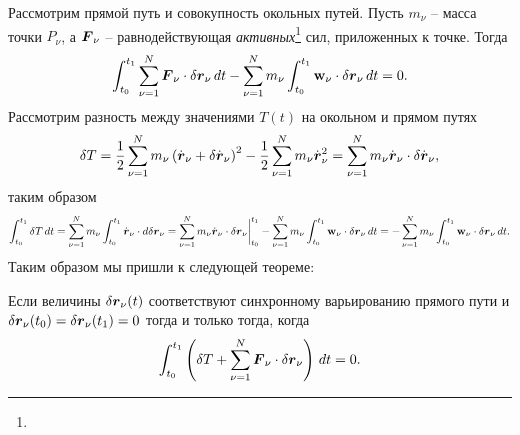 Рассмотрим прямой путь и совокупность окольных путей. Пусть $m_\nu$ -- масса точки $P_\nu$, а $\mbox{\boldmath $F$}_\nu$ -- равнодействующая \textit{активных}\footnote{
} сил, приложенных к точке. Тогда
\begin{equation*}
    \int_{t_0}^{t_1} \sum_{\nu=1}^{N} \mbox{\boldmath $F$}_\nu \cdot \delta \mbox{\boldmath $r$}_\nu \, d t - 
    \sum_{\nu=1}^N m_\nu \int_{t_0}^{t_1} \mbox{\boldmath $\mathrm{w}$}_\nu \cdot \delta \mbox{\boldmath $r$}_\nu \, d t = 0.
\end{equation*}
Рассмотрим разность между значениями $T(t)$ на окольном и прямом путях
\begin{equation*}
    \delta T = \frac{1}{2} \sum_{\nu=1}^N m_\nu \left(
        \dot{\mbox{\boldmath $r$}}_\nu + \delta \dot{\mbox{\boldmath $r$}}_\nu
    \right)^2 - \frac{1}{2} \sum_{\nu=1}^N m_\nu \dot{\mbox{\boldmath $r$}}_\nu^2 = 
    \sum_{\nu=1}^N m_\nu \dot{\mbox{\boldmath $r$}}_\nu \cdot \delta \dot{\mbox{\boldmath $r$}}_\nu,
\end{equation*} 
таким образом
\begin{equation*}
     \int_{t_0}^{t_1} \delta T \, d t = \sum_{\nu=1}^N  m_\nu \int_{t_0}^{t_1} \dot{\mbox{\boldmath $r$}}_\nu \cdot d \delta \mbox{\boldmath $r$}_\nu = \sum_{\nu=1}^N m_\nu \dot{\mbox{\boldmath $r$}}_\nu \cdot \delta \mbox{\boldmath $r$}_\nu 
    \bigg|_{t_0}^{t_1} - \sum_{\nu=1}^N m_\nu \int_{t_0}^{t_1} \mbox{\boldmath $\mathrm{w}$}_\nu \cdot \delta \mbox{\boldmath $r$}_\nu \, d t = 
    - \sum_{\nu=1}^N  m_\nu \int_{t_0}^{t_1} \mbox{\boldmath $\mathrm{w}$}_\nu \cdot \delta \mbox{\boldmath $r$}_\nu \, d t.
\end{equation*}
Таким образом мы пришли к следующей теореме:

\begin{to_thr}
     Если величины $\delta \mbox{\boldmath $r$}_\nu (t)$ соответствуют синхронному варьированию прямого пути и $\delta \mbox{\boldmath $r$}_\nu (t_0) = \delta \mbox{\boldmath $r$}_\nu (t_1) = 0$ тогда и только тогда, когда
     \begin{equation*}
         \int_{t_0}^{t_1} \left(
            \delta T + \sum_{\nu=1}^N \mbox{\boldmath $F$}_\nu \cdot \delta \mbox{\boldmath $r$}_\nu
         \right) \, d t = 0.
     \end{equation*}
\end{to_thr}

